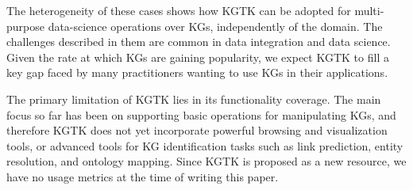 \documentclass[runningheads]{llncs}
\newcommand{\kibitz}[2]{%
{\color{#1}#2}{}%
}
\newcommand{\filip}[1]{\kibitz{purple}{[FI:#1]}} %
\newcommand{\DG}[1]{\kibitz{red}{[DG: #1]}} %
\begin{document}



The heterogeneity of these cases shows how KGTK can be adopted for multi-purpose data-science operations over KGs, independently of the domain. The challenges described in them are common in data integration and data science. Given the rate at which KGs are gaining popularity, we expect KGTK to fill a key gap faced by many practitioners wanting to use KGs in their applications.

The primary limitation of KGTK lies in its functionality coverage. The main focus so far has been on supporting basic operations for manipulating KGs, and therefore KGTK does not yet incorporate powerful browsing and visualization tools, or advanced tools for KG identification tasks such as link prediction, entity resolution, and ontology mapping.
Since KGTK is proposed as a new resource, we have no usage metrics at the time of writing this paper.







\end{document}

